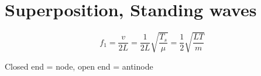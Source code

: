 \chapter{Superposition, Standing waves}

$$f_1 = \frac{v}{2L} = \frac{1}{2L}\sqrt{\frac{T_s}{\mu}} = \frac{1}{2} \sqrt{\frac{LT}{m}}$$

Closed end = node, open end = antinode
